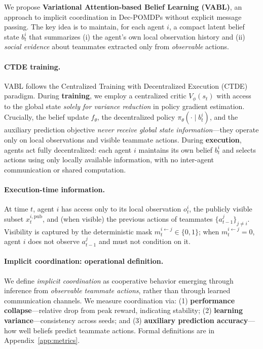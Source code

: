 \documentclass{article}
\theoremstyle{plain}
\theoremstyle{definition}
\theoremstyle{remark}
\begin{document}
We propose \textbf{Variational Attention-based Belief Learning (VABL)}, an approach to implicit coordination in Dec-POMDPs without explicit message passing. The key idea is to maintain, for each agent $i$, a compact latent belief state $b_t^i$ that summarizes (i) the agent's own local observation history and (ii) \emph{social evidence} about teammates extracted only from \emph{observable} actions.

\paragraph{CTDE training.}
VABL follows the Centralized Training with Decentralized Execution (CTDE) paradigm. During \textbf{training}, we employ a centralized critic $V_\phi(s_t)$ with access to the global state \emph{solely for variance reduction} in policy gradient estimation. Crucially, the belief update $f_\theta$, the decentralized policy $\pi_\theta(\cdot \mid b_t^i)$, and the auxiliary prediction objective \emph{never receive global state information}---they operate only on local observations and visible teammate actions. During \textbf{execution}, agents act fully decentralized: each agent $i$ maintains its own belief $b_t^i$ and selects actions using only locally available information, with no inter-agent communication or shared computation.

\paragraph{Execution-time information.}
At time $t$, agent $i$ has access only to its local observation $o_t^i$, the publicly visible subset $x_t^{i,\mathrm{pub}}$, and (when visible) the previous actions of teammates $\{a_{t-1}^j\}_{j\neq i}$. Visibility is captured by the deterministic mask $m_t^{i\leftarrow j}\in\{0,1\}$; when $m_t^{i\leftarrow j}=0$, agent $i$ does not observe $a_{t-1}^j$ and must not condition on it.

\paragraph{Implicit coordination: operational definition.}
We define \emph{implicit coordination} as cooperative behavior emerging through inference from \emph{observable teammate actions}, rather than through learned communication channels. We measure coordination via: (1) \textbf{performance collapse}---relative drop from peak reward, indicating stability; (2) \textbf{learning variance}---consistency across seeds; and (3) \textbf{auxiliary prediction accuracy}---how well beliefs predict teammate actions. Formal definitions are in Appendix~\ref{app:metrics}.
\end{document}
